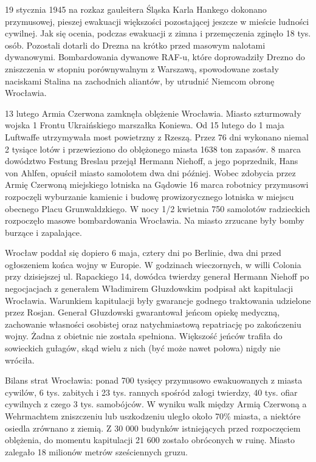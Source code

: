 \documentclass{article}
\begin{document}
19 stycznia 1945 na rozkaz gauleitera Śląska Karla Hankego dokonano przymusowej, pieszej ewakuacji większości pozostającej jeszcze w mieście ludności cywilnej. Jak się ocenia, podczas ewakuacji z zimna i przemęczenia zginęło 18 tys. osób. Pozostali dotarli do Drezna na krótko przed masowym nalotami dywanowymi. Bombardowania dywanowe RAF-u, które doprowadziły Drezno do zniszczenia w stopniu porównywalnym z Warszawą, spowodowane zostały naciskami Stalina na zachodnich aliantów, by utrudnić Niemcom obronę Wrocławia.

13 lutego Armia Czerwona zamknęła oblężenie Wrocławia. Miasto szturmowały wojska 1 Frontu Ukraińskiego marszałka Koniewa. Od 15 lutego do 1 maja Luftwaffe utrzymywała most powietrzny z Rzeszą. Przez 76 dni wykonano niemal 2 tysiące lotów i przewieziono do oblężonego miasta 1638 ton zapasów. 8 marca dowództwo Festung Breslau przejął Hermann Niehoff, a jego poprzednik, Hans von Ahlfen, opuścił miasto samolotem dwa dni później. Wobec zdobycia przez Armię Czerwoną miejskiego lotniska na Gądowie 16 marca robotnicy przymusowi rozpoczęli wyburzanie kamienic i budowę prowizorycznego lotniska w miejscu obecnego Placu Grunwaldzkiego. W nocy 1/2 kwietnia 750 samolotów radzieckich rozpoczęło masowe bombardowania Wrocławia. Na miasto zrzucane były bomby burzące i zapalające.

Wrocław poddał się dopiero 6 maja, cztery dni po Berlinie, dwa dni przed ogłoszeniem końca wojny w Europie. W godzinach wieczornych, w willi Colonia przy dzisiejszej ul. Rapackiego 14, dowódca twierdzy generał Hermann Niehoff po negocjacjach z generałem Władimirem Głuzdowskim podpisał akt kapitulacji Wrocławia. Warunkiem kapitulacji były gwarancje godnego traktowania udzielone przez Rosjan. Generał Głuzdowski gwarantował jeńcom opiekę medyczną, zachowanie własności osobistej oraz natychmiastową repatriację po zakończeniu wojny. Żadna z obietnic nie została spełniona. Większość jeńców trafiła do sowieckich gułagów, skąd wielu z nich (być może nawet połowa) nigdy nie wróciła.

Bilans strat Wrocławia: ponad 700 tysięcy przymusowo ewakuowanych z miasta cywilów, 6 tys. zabitych i 23 tys. rannych spośród załogi twierdzy, 40 tys. ofiar cywilnych z czego 3 tys. samobójców. W wyniku walk między Armią Czerwoną a Wehrmachtem zniszczeniu lub uszkodzeniu uległo około 70\% miasta, a niektóre osiedla zrównano z ziemią. Z 30 000 budynków istniejących przed rozpoczęciem oblężenia, do momentu kapitulacji 21 600 zostało obróconych w ruinę. Miasto zalegało 18 milionów metrów sześciennych gruzu.
\end{document}
